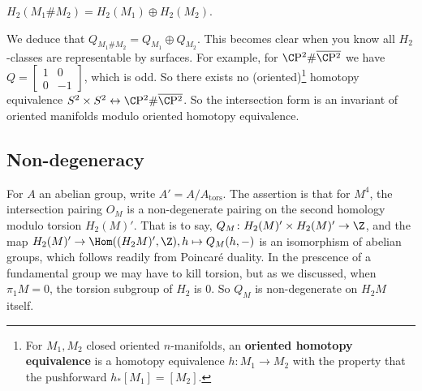 \begin{note}
    $H_2 (M_1 \# M_2) = H_2 (M_1)\oplus H_2(M_2)$.
\end{note}
We deduce that $Q _{M_1\# M_2}= Q _{M_1}\oplus Q _{M_2}$. This becomes clear when you know all $H_2$-classes are representable by surfaces. For example, for $\C \mathrm{P^2} \# \overline{\C \mathrm{P^2}}$ we have $Q = \left[ 
\begin{smallmatrix}
    1 & 0 \\ 0 & -1
\end{smallmatrix}\right] $, which is odd. So there exists no (oriented)\footnote{For $M_1,M_2 $ closed oriented $n$-manifolds, an \textbf{oriented homotopy equivalence} is a homotopy equivalence $h \colon M_1 \to M_2$ with the property that the pushforward $h_*[M_1]=[M_2]$.} homotopy equivalence $S^2 \times  S^2 \leftrightarrow \C \mathrm{P^2}\# \overline{\C \mathrm{P^2}}$. So the intersection form is an invariant of oriented manifolds modulo oriented homotopy equivalence.
\subsection{Non-degeneracy}
For $A$ an abelian group, write $A' = A / A _{\mathrm{tors}}$. The assertion is that for $M^4$, the intersection pairing $O_M$ is a non-degenerate pairing on the second homology modulo torsion $H_2(M)'$. That is to say, $Q_M \colon H_2(M)' \times H_2(M)' \to \Z$, and the map $H_2(M)' \to  \Hom((H_2M)', \Z), h \mapsto  Q_M(h, -)$ is an isomorphism of abelian groups, which follows readily from Poincar\'e duality. In the prescence of a fundamental group we may have to kill torsion, but as we discussed, when $\pi_1 M = 0$, the torsion subgroup of $H_2$ is 0. So $Q_M$ is non-degenerate on $H_2 M$ itself.

